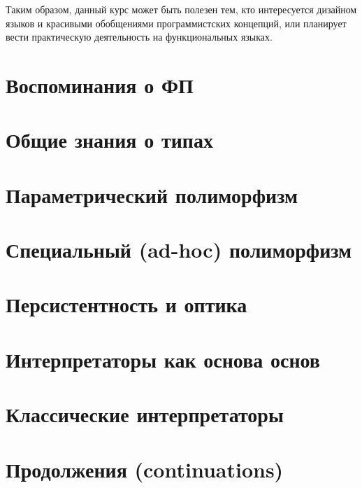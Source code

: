 \documentclass[12pt]{article}
\begin{document}
    Таким образом, данный курс может быть полезен тем, кто интересуется дизайном языков и красивыми обобщениями программистских концепций, или планирует вести практическую деятельность на функциональных языках.


    \clearpage


    \section{Воспоминания о ФП}

    

    \clearpage


    \section{Общие знания о типах}

    

    \clearpage


    \section{Параметрический полиморфизм}
%
%    
%


    \section{Специальный (ad-hoc) полиморфизм} \label{sec:ad-hoc}
%
%    
%


    \section{Персистентность и оптика}
%
%    
%


    \section{Интерпретаторы как основа основ}



    \section{Классические интерпретаторы}

%    
%


    \section{Продолжения (continuations)} \label{sec:continuations}
%
%    
%
\end{document}
